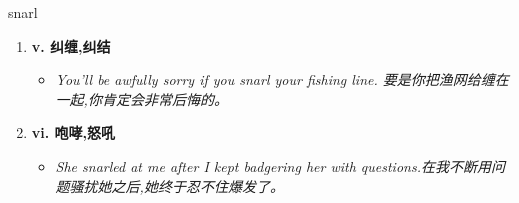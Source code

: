 
\begin{frame}
{\huge snarl}
\begin{center}
\begin{enumerate}\Large
  \item \textbf{v. 纠缠,纠结}
  \begin{itemize}
    \item \em{\Large{You'll be awfully sorry if you snarl your fishing line. 要是你把渔网给缠在一起,你肯定会非常后悔的。}}
  \end{itemize}
  \item \textbf{vi. 咆哮,怒吼}
  \begin{itemize}
    \item \em{\Large{She snarled at me after I kept badgering her with questions.在我不断用问题骚扰她之后,她终于忍不住爆发了。}}
  \end{itemize}
\end{enumerate}
\end{center}
\end{frame}
